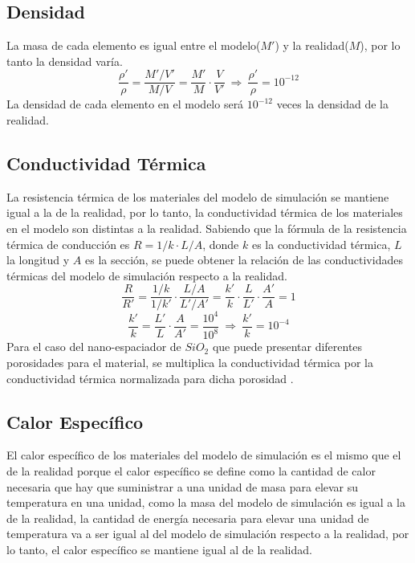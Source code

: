 \subsection{Densidad}
La masa de cada elemento es igual entre el modelo($M'$) y la realidad($M$), por lo tanto la densidad varía.
\begin{equation}
\dfrac{\rho '}{\rho}=\dfrac{M'/V'}{M/V}=\dfrac{M'}{M}\cdot \dfrac{V}{V'} \ \Longrightarrow \ 
\dfrac{\rho '}{\rho}=10^{-12}
\label{eq:relacion_densidad}
\end{equation}
La densidad de cada elemento en el modelo será $10^{-12}$ veces la densidad de la realidad.
\subsection{Conductividad Térmica}
La resistencia térmica de los materiales del modelo de simulación se mantiene igual a la de la realidad, por lo tanto, la conductividad térmica de los materiales en el modelo son distintas a la realidad. Sabiendo que la fórmula de la resistencia térmica de conducción es $R=1/k \cdot L/A$, donde $k$ es la conductividad térmica, $L$ la longitud y $A$ es la sección, se puede obtener la relación de las conductividades térmicas del modelo de simulación respecto a la realidad.
\[ \dfrac{R}{R'}= \dfrac{1/k}{1/k'}\cdot \dfrac{L/A}{L'/A'}= \dfrac{k'}{k}\cdot \dfrac{L}{L'}\cdot \dfrac{A'}{A}=1\]
\begin{equation}
\dfrac{k'}{k}=\dfrac{L'}{L}\cdot \dfrac{A}{A'}=\dfrac{10^4}{10^8} \ \Longrightarrow \ \dfrac{k'}{k}=10^{-4}
\label{eq:relacion_conductividadTermica}
\end{equation}
Para el caso del nano-espaciador de $SiO_2$ que puede presentar diferentes porosidades para el material, se multiplica la conductividad térmica por la conductividad térmica normalizada para dicha porosidad \cite{ThermalConductivity_SiO2_2018}.
\subsection{Calor Específico}
El calor específico de los materiales del modelo de simulación es el mismo que el de la realidad porque el calor específico se define como la cantidad de calor necesaria que hay que suministrar a una unidad de masa para elevar su temperatura en una unidad, como la masa del modelo de simulación es igual a la de la realidad, la cantidad de energía necesaria para elevar una unidad de temperatura va a ser igual al del modelo de simulación respecto a la realidad, por lo tanto, el calor específico se mantiene igual al de la realidad.

